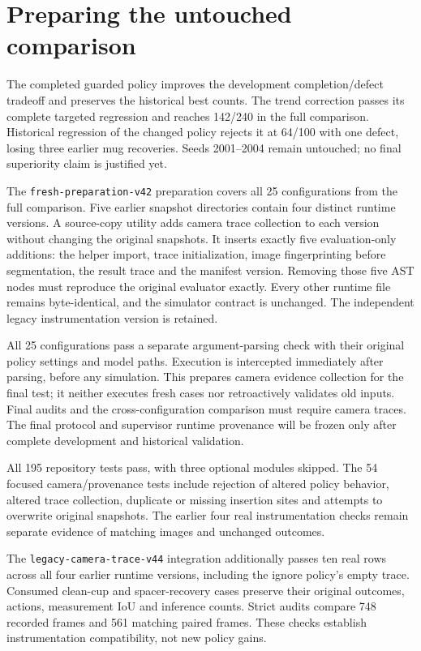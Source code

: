 \documentclass[10pt,letterpaper]{article}
\begin{document}
\clearpage
\section{Preparing the untouched comparison}

The completed guarded policy improves the development completion/defect tradeoff
and preserves the historical best counts. The trend correction passes its
complete targeted regression and reaches 142/240 in the full comparison.
Historical regression of the changed policy rejects it at 64/100 with one defect,
losing three earlier mug recoveries. Seeds 2001--2004
remain untouched; no final superiority claim is justified yet.

The \texttt{fresh-preparation-v42} preparation covers all 25 configurations from
the full comparison. Five earlier snapshot directories contain four distinct
runtime versions. A source-copy utility adds camera trace collection to each
version without changing the original snapshots. It inserts exactly five
evaluation-only additions: the helper import, trace initialization, image
fingerprinting before segmentation, the result trace and the manifest version.
Removing those five AST nodes must reproduce the original evaluator exactly.
Every other runtime file remains byte-identical, and the simulator contract
is unchanged. The independent legacy instrumentation version is retained.

All 25 configurations pass a separate argument-parsing check with their original
policy settings and model paths. Execution is intercepted immediately after
parsing, before any simulation. This prepares camera evidence collection for
the final test; it neither executes fresh cases nor retroactively validates
old inputs. Final audits and the cross-configuration comparison must require
camera traces. The final protocol and supervisor runtime provenance will be
frozen only after complete development and historical validation.

All 195 repository tests pass, with three optional modules skipped. The 54
focused camera/provenance tests include rejection of altered policy behavior,
altered trace collection, duplicate or missing insertion sites and attempts to
overwrite original snapshots. The earlier four real instrumentation checks
remain separate evidence of matching images and unchanged outcomes.

The \texttt{legacy-camera-trace-v44} integration additionally passes ten real
rows across all four earlier runtime versions, including the ignore policy's
empty trace. Consumed clean-cup and spacer-recovery cases preserve their original
outcomes, actions, measurement IoU and inference counts. Strict audits compare
748 recorded frames and 561 matching paired frames. These checks establish
instrumentation compatibility, not new policy gains.
\end{document}
